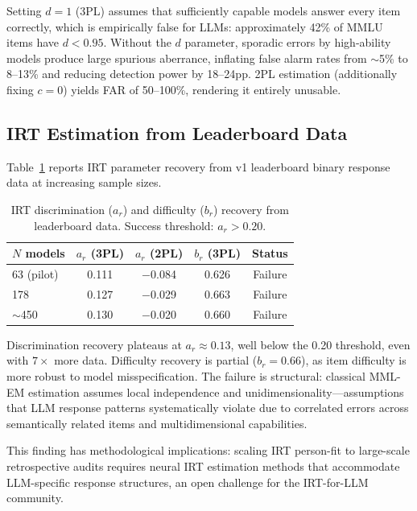 \documentclass[11pt]{article}
\begin{document}
Setting $d = 1$ (3PL) assumes that sufficiently capable models answer every item correctly, which is empirically false for LLMs: approximately 42\% of MMLU items have $d < 0.95$.
Without the $d$ parameter, sporadic errors by high-ability models produce large spurious aberrance, inflating false alarm rates from $\sim$5\% to 8--13\% and reducing detection power by 18--24pp.
2PL estimation (additionally fixing $c = 0$) yields FAR of 50--100\%, rendering it entirely unusable.

\subsection{IRT Estimation from Leaderboard Data}
\label{sec:irt_refit}

Table~\ref{tab:irt_refit} reports IRT parameter recovery from v1 leaderboard binary response data at increasing sample sizes.

\begin{table}[t]
\centering
\caption{IRT discrimination ($a_r$) and difficulty ($b_r$) recovery from leaderboard data. Success threshold: $a_r > 0.20$.}
\label{tab:irt_refit}
\small
\begin{tabular}{lcccc}
\toprule
$N$ models & $a_r$ (3PL) & $a_r$ (2PL) & $b_r$ (3PL) & Status \\
\midrule
63 (pilot) & 0.111 & $-$0.084 & 0.626 & Failure \\
178 & 0.127 & $-$0.029 & 0.663 & Failure \\
$\sim$450 & 0.130 & $-$0.020 & 0.660 & Failure \\
\bottomrule
\end{tabular}
\end{table}

Discrimination recovery plateaus at $a_r \approx 0.13$, well below the 0.20 threshold, even with $7\times$ more data.
Difficulty recovery is partial ($b_r = 0.66$), as item difficulty is more robust to model misspecification.
The failure is structural: classical MML-EM estimation assumes local independence and unidimensionality---assumptions that LLM response patterns systematically violate due to correlated errors across semantically related items and multidimensional capabilities.

This finding has methodological implications: scaling IRT person-fit to large-scale retrospective audits requires neural IRT estimation methods that accommodate LLM-specific response structures, an open challenge for the IRT-for-LLM community.
\end{document}
